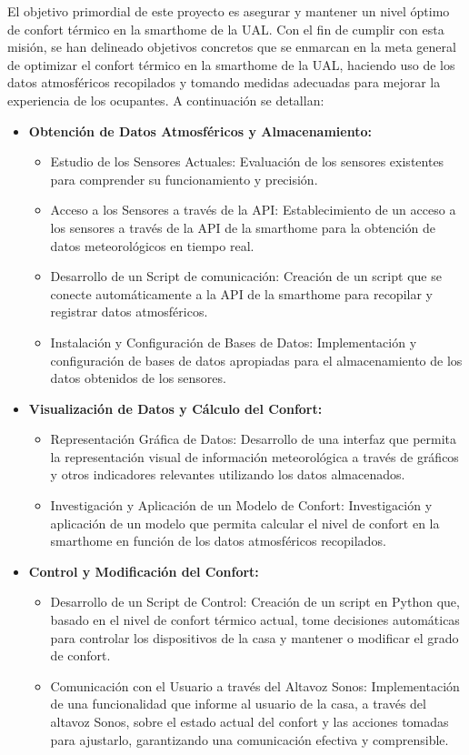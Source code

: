 El objetivo primordial de este proyecto es asegurar y mantener un nivel óptimo de confort térmico en la smarthome de la UAL. Con el fin de cumplir con esta misión, se han delineado objetivos concretos que se enmarcan en la meta general de optimizar el confort térmico en la smarthome de la UAL, haciendo uso de los datos atmosféricos recopilados y tomando medidas adecuadas para mejorar la experiencia de los ocupantes. A continuación se detallan:

\begin{itemize}
    \item \textbf{Obtención de Datos Atmosféricos y Almacenamiento:}
    \begin{itemize}
        \item Estudio de los Sensores Actuales: Evaluación de los sensores existentes para comprender su funcionamiento y precisión.
        \item Acceso a los Sensores a través de la API: Establecimiento de un acceso a los sensores a través de la API de la smarthome para la obtención de datos meteorológicos en tiempo real.
        \item Desarrollo de un Script de comunicación: Creación de un script  que se conecte automáticamente a la API de la smarthome para recopilar y registrar datos atmosféricos.
        \item Instalación y Configuración de Bases de Datos: Implementación y configuración de bases de datos apropiadas para el almacenamiento de los datos obtenidos de los sensores.
    \end{itemize}

    \item \textbf{Visualización de Datos y Cálculo del Confort:}
    \begin{itemize}
        \item Representación Gráfica de Datos: Desarrollo de una interfaz que permita la representación visual de información meteorológica a través de gráficos y otros indicadores relevantes utilizando los datos almacenados.
        \item Investigación y Aplicación de un Modelo de Confort: Investigación y aplicación de un modelo que permita calcular el nivel de confort en la smarthome en función de los datos atmosféricos recopilados.
    \end{itemize}

    \item \textbf{Control y Modificación del Confort:}
    \begin{itemize}
        \item Desarrollo de un Script de Control: Creación de un script en Python que, basado en el nivel de confort térmico actual, tome decisiones automáticas para controlar los dispositivos de la casa y mantener o modificar el grado de confort.
        \item Comunicación con el Usuario a través del Altavoz Sonos: Implementación de una funcionalidad que informe al usuario de la casa, a través del altavoz Sonos, sobre el estado actual del confort y las acciones tomadas para ajustarlo, garantizando una comunicación efectiva y comprensible.
    \end{itemize}


\end{itemize}
